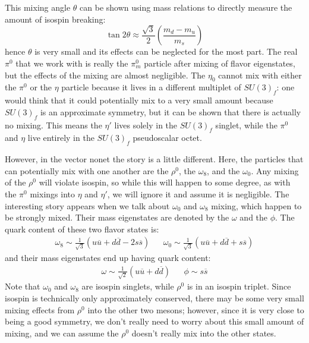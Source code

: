 \documentclass[11pt, oneside]{article}   	%
\theoremstyle{definition}
\numberwithin{equation}{subsection}		%
\begin{document}
This mixing angle $\theta$ can be shown using mass relations to directly measure the amount of isospin breaking:
\begin{equation}
	\tan 2\theta \approx\frac{\sqrt 3}{2} \left( \frac{m_d - m_u}{m_s} \right)
\end{equation}
hence $\theta$ is very small and its effects can be neglected for the most part. The real $\pi^0$ that we work with is really the $\pi^0_m$ particle after 
mixing of flavor eigenstates, but the effects of the mixing are almost negligible. The $\eta_0$ cannot mix with either the $\pi^0$ or the $\eta$ particle because 
it lives in a different multiplet of $SU(3)_f$: one would think that it could potentially mix to a very small amount because $SU(3)_f$ is an approximate symmetry, 
but it can be shown that there is actually no mixing. This means the $\eta'$ lives solely in the $SU(3)_f$ singlet, while the $\pi^0$ and $\eta$ live entirely in the 
$SU(3)_f$ pseudoscalar octet.

However, in the vector nonet the story is a little different. Here, the particles that can potentially mix with one another are the $\rho^0$, the $\omega_8$, and the 
$\omega_0$. Any mixing of the $\rho^0$ will violate isospin, so while this will happen to some degree, as with the $\pi^0$ mixings into $\eta$ and $\eta'$, we 
will ignore it and assume it is negligible. The interesting story appears when we talk about $\omega_0$ and $\omega_8$ mixing, which happen to be strongly mixed. 
Their mass eigenstates are denoted by the $\omega$ and the $\phi$. The quark content of these two flavor states is:
\begin{align}
	\omega_8\sim \frac{1}{\sqrt 3} (u\overline u + d\overline d - 2s\overline s) && \omega_0\sim \frac{1}{\sqrt 3} (u\overline u + d\overline d + s\overline s)
\end{align}
and their mass eigenstates end up having quark content:
\begin{align}
	\omega\sim \frac{1}{\sqrt 2} (u\overline u + d\overline d) && \phi\sim s\overline s
\end{align}
Note that $\omega_0$ and $\omega_8$ are isospin singlets, while $\rho^0$ is in an isospin triplet. Since isospin is technically only approximately 
conserved, there may be some very small mixing effects from $\rho^0$ into the other two mesons; however, since it is very close to being a good 
symmetry, we don't really need to worry about this small amount of mixing, and we can assume the $\rho^0$ doesn't really mix into the 
other states. 
\end{document}
